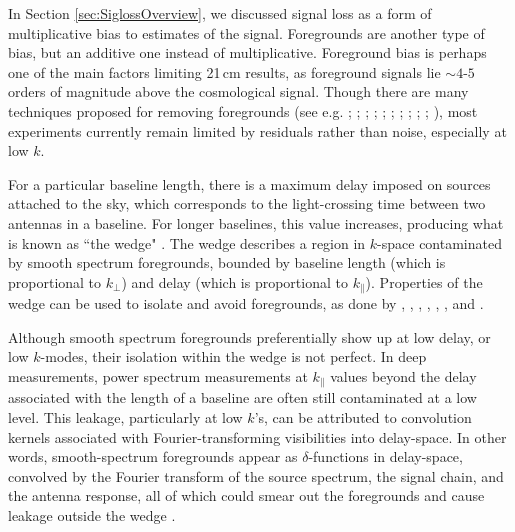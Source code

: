 \documentclass[preprint2,numberedappendix,tighten]{aastex6}  %
\begin{document}
In Section \ref{sec:SiglossOverview}, we discussed signal loss as a form of multiplicative bias to estimates of the signal. Foregrounds are another type of bias, but an additive one instead of multiplicative. Foreground bias is perhaps one of the main factors limiting 21\,cm results, as foreground signals lie $\sim4$-$5$ orders of 
magnitude above the cosmological signal. Though there are many techniques proposed for removing foregrounds (see e.g. \citealt{vedantham_et_al2012}; \citealt{parsons_et_al2012a}; \citealt{parsons_et_al2012b}; \citealt{dillon_et_al2013a}; \citealt{wang_et_al2013}; \citealt{parsons_et_al2014}; \citealt{liu_et_al2014a}; \citealt{liu_et_al2014b}; \citealt{dillon_et_al2015}; \citealt{pober_et_al2016a}; \citealt{trott_et_al2016}), most 
experiments currently remain limited by residuals rather than noise, especially at low $k$.

For a particular 
baseline length, there is a maximum delay imposed on sources attached to the sky, which corresponds to the light-crossing time between two 
antennas in a baseline. For longer baselines, this value increases, producing what is known as ``the 
wedge"
\citep{datta_et_al2010, parsons_et_al2012b, vedantham_et_al2012, pober_et_al2013, thyagarajan_et_al2013, liu_et_al2014a, liu_et_al2014b, patil_et_al2017}. 
The wedge describes a region in $k$-space contaminated by smooth spectrum foregrounds, bounded by baseline length (which is proportional to $k_{\perp}$) and delay (which is 
proportional to $k_{\parallel}$). Properties of the wedge can be used to isolate and 
avoid foregrounds, as done by , 
\citet{parsons_et_al2014}, \citet{dillon_et_al2014}, \citet{dillon_et_al2015}, \citet{jacobs_et_al2015}, \citet{beardsley_et_al2016}, and \citet{trott_et_al2016}.

Although smooth spectrum foregrounds preferentially show up at low delay, or low $k$-modes, their isolation within the wedge is not perfect. In deep measurements, power spectrum measurements at $k_{\parallel}$ values beyond 
the delay associated with the length of a baseline are often still contaminated at a low level. This leakage, particularly at low $k$'s, can be attributed to 
convolution kernels associated with Fourier-transforming visibilities into delay-space. In other words, smooth-spectrum 
foregrounds appear as $\delta$-functions in delay-space, convolved by the Fourier transform of the source spectrum, the signal chain, and the 
antenna response, all of which could smear out the foregrounds and cause leakage outside the wedge \citep[e.g.][]{ewall-wice_et_al2017}.
\end{document}
